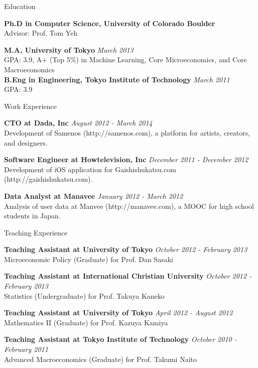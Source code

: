 \documentclass{resume} %
\begin{document}
\begin{rSection}{Education}

{\bf Ph.D in Computer Science, University of Colorado Boulder} \\
Advisor: Prof. Tom Yeh

{\bf M.A, University of Tokyo} \hfill {\em March 2013} \\ 
GPA: 3.9, A+ (Top 5\%) in Machine Learning, Core Microeconomics, and Core Macroeconomics \\


{\bf B.Eng in Engineering, Tokyo Institute of Technology} \hfill {\em March 2011} \\
GPA: 3.9


\end{rSection}


\begin{rSection}{Work Experience}

{\bf CTO at Dada, Inc} \hfill {\em August 2012 - March 2014} \\ 
Development of Samenos (http://samenos.com), a platform for artists, creators, and designers.

{\bf Software Engineer at Howtelevision, Inc} \hfill {\em December 2011 - December 2012} \\ 
Development of iOS application for Gaishishukatsu.com (http://gaishishukatsu.com).

{\bf Data Analyst at Manavee} \hfill {\em January 2012 - March 2012} \\ 
Analysis of user data at Manvee (http://manavee.com), a MOOC for high school students in Japan. 

\end{rSection}


\begin{rSection}{Teaching Experience}

{\bf Teaching Assistant at University of Tokyo} \hfill {\em October 2012 - February 2013} \\ 
Microeconomic Policy (Graduate) for Prof. Dan Sasaki 

{\bf Teaching Assistant at International Christian University} \hfill {\em October 2012 - February 2013} \\ 
Statistics (Undergraduate) for Prof. Takuya Kaneko 

{\bf Teaching Assistant at University of Tokyo} \hfill {\em April 2012 - August 2012} \\ 
Mathematics II (Graduate) for Prof. Kazuya Kamiya 

{\bf Teaching Assistant at Tokyo Institute of Technology} \hfill {\em October 2010 - February 2011} \\ 
Advanced Macroeconomics (Graduate) for Prof. Takumi Naito

\end{rSection}
\end{document}

